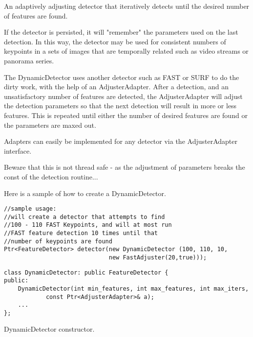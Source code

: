 An adaptively adjusting detector that iteratively detects until the desired number
of features are found.  

If the detector is persisted, it will "remember" the parameters
used on the last detection. In this way, the detector may be used for consistent numbers
of keypoints in a sets of images that are temporally related such as video streams or
panorama series.

The DynamicDetector uses another detector such as FAST or SURF to do the dirty work,
with the help of an AdjusterAdapter.
After a detection, and an unsatisfactory number of features are detected,
the AdjusterAdapter will adjust the detection parameters so that the next detection will
result in more or less features.  This is repeated until either the number of desired features are found
or the parameters are maxed out.

Adapters can easily be implemented for any detector via the  
AdjusterAdapter interface.

Beware that this is not thread safe - as the adjustment of parameters breaks the const
of the detection routine...

Here is a sample of how to create a DynamicDetector.
\begin{lstlisting}
//sample usage:
//will create a detector that attempts to find 
//100 - 110 FAST Keypoints, and will at most run
//FAST feature detection 10 times until that 
//number of keypoints are found
Ptr<FeatureDetector> detector(new DynamicDetector (100, 110, 10,
                              new FastAdjuster(20,true)));
\end{lstlisting}
 
\begin{lstlisting}
class DynamicDetector: public FeatureDetector {
public:
	DynamicDetector(int min_features, int max_features, int max_iters,
			const Ptr<AdjusterAdapter>& a);
 	...
};
\end{lstlisting}

DynamicDetector constructor.

\begin{description}  
\end{description}


